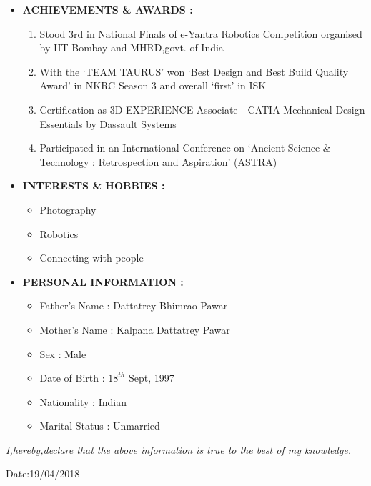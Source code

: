 \documentclass[11pt]{article}
\begin{document}
\begin{itemize}[label=$\star$]
\newpage
\item	\begin{large} \textbf{ACHIEVEMENTS \& AWARDS :} \end{large}
\begin{enumerate}
	\item Stood 3rd in National Finals of e-Yantra Robotics Competition organised by IIT Bombay and 
	MHRD,govt. of India
	\item With the ‘TEAM TAURUS’ won ‘Best Design and Best Build Quality Award’ in NKRC Season 3 and overall ‘first’ in ISK 
	\item Certification as 3D-EXPERIENCE Associate - CATIA Mechanical Design Essentials by Dassault Systems
	\item Participated in an International Conference on ‘Ancient Science \& Technology : Retrospection and Aspiration’ (ASTRA)
\end{enumerate}

	\bigskip
\item	\begin{large} \textbf{INTERESTS \& HOBBIES :} \end{large}
\begin{itemize}[label=$\bullet$]
	\item Photography
	\item Robotics
	\item Connecting with people
\end{itemize}

	\bigskip
\item	\begin{large} \textbf{PERSONAL INFORMATION :} \end{large}
\begin{itemize}[label=$-$]
	\item	Father's Name  :  Dattatrey Bhimrao Pawar
	\item	Mother's Name  :  Kalpana Dattatrey Pawar
	\item	Sex            :  Male
	\item	Date of Birth  :  $18^{th}$ Sept, 1997
	\item   Nationality    :  Indian
	\item   Marital Status :  Unmarried
\end{itemize}
\end{itemize}

\bigskip
\begin{large}\textit{I,hereby,declare that the above information is true to the best of my knowledge.}\end{large}

\begin{flushright} Date:19/04/2018 \end{flushright}
\end{document}
